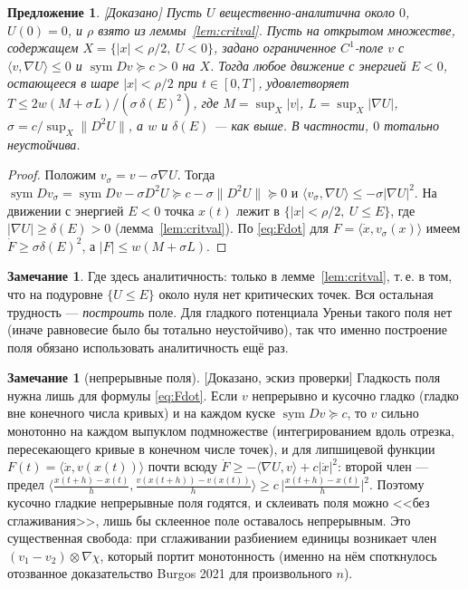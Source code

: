 \documentclass[11pt,a4paper]{article}
\newtheorem{proposition}[theorem]{Предложение}
\theoremstyle{definition}
\newtheorem{remark}[theorem]{Замечание}
\newcommand{\sym}{\operatorname{sym}}
\newcommand{\mk}[1]{\textsf{[#1]}}
\begin{document}
\begin{proposition}\label{prop:palamodov-variant}
\mk{Доказано} Пусть $U$ вещественно-аналитична около $0$, $U(0)=0$, и $\rho$ взято из
леммы~\ref{lem:critval}. Пусть на открытом множестве, содержащем $X=\{|x|<\rho/2,\ U<0\}$,
задано ограниченное $C^1$-поле $v$ с $\langle v,\nabla U\rangle\le0$ и $\sym Dv\succeq c>0$ на
$X$. Тогда любое движение с энергией $E<0$, остающееся в шаре $|x|<\rho/2$ при $t\in[0,T]$,
удовлетворяет $T\le 2w(M+\sigma L)/(\sigma\,\delta(E)^2)$, где $M=\sup_X|v|$,
$L=\sup_X|\nabla U|$, $\sigma=c/\sup_{X}\lVert D^2U\rVert$, а $w$ и $\delta(E)$ --- как выше.
В частности, $0$ тотально неустойчива.
\end{proposition}
\begin{proof}
Положим $v_\sigma=v-\sigma\nabla U$. Тогда $\sym Dv_\sigma=\sym Dv-\sigma D^2U\succeq
c-\sigma\lVert D^2U\rVert\succeq0$ и $\langle v_\sigma,\nabla U\rangle\le-\sigma|\nabla U|^2$. На
движении с энергией $E<0$ точка $x(t)$ лежит в $\{|x|<\rho/2,\ U\le E\}$, где
$|\nabla U|\ge\delta(E)>0$ (лемма~\ref{lem:critval}). По \eqref{eq:Fdot} для
$F=\langle\dot x,v_\sigma(x)\rangle$ имеем $\dot F\ge\sigma\delta(E)^2$, а $|F|\le w(M+\sigma L)$.
\end{proof}

\begin{remark}\label{rem:where-analytic}
Где здесь аналитичность: только в лемме~\ref{lem:critval}, т.\,е. в том, что на подуровне
$\{U\le E\}$ около нуля нет критических точек. Вся остальная трудность --- \emph{построить}
поле. Для гладкого потенциала Уреньи такого поля нет (иначе равновесие было бы тотально
неустойчиво), так что именно построение поля обязано использовать аналитичность ещё раз.
\end{remark}

\begin{remark}[непрерывные поля]\label{rem:lipschitz}
\mk{Доказано, эскиз проверки} Гладкость поля нужна лишь для формулы \eqref{eq:Fdot}. Если $v$
непрерывно и кусочно гладко (гладко вне конечного числа кривых) и на каждом куске
$\sym Dv\succeq c$, то $v$ сильно монотонно на каждом выпуклом подмножестве (интегрированием
вдоль отрезка, пересекающего кривые в конечном числе точек), и для липшицевой функции
$F(t)=\langle\dot x,v(x(t))\rangle$ почти всюду
$\dot F\ge-\langle\nabla U,v\rangle+c|\dot x|^2$: второй член --- предел
$\langle\frac{x(t+h)-x(t)}h,\frac{v(x(t+h))-v(x(t))}h\rangle\ge c\,\bigl|\frac{x(t+h)-x(t)}h\bigr|^2$.
Поэтому кусочно гладкие непрерывные поля годятся, и склеивать поля можно <<без сглаживания>>,
лишь бы склеенное поле оставалось непрерывным. Это существенная свобода: при сглаживании
разбиением единицы возникает член $(v_1-v_2)\otimes\nabla\chi$, который портит монотонность
(именно на нём споткнулось отозванное доказательство Burgos 2021 для произвольного $n$).
\end{remark}
\end{document}
